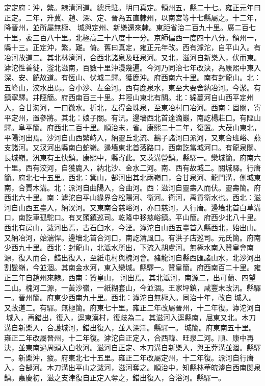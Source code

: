 \begin{pinyinscope}
定定府：沖，繁。隸清河道。總兵駐。明曰真定。領州五，縣二十七。雍正元年曰正定。二年，升冀、趙、深、定、晉為五直隸州，以南宮等十七縣屬之。十二年，降晉州，並所屬無極、城與定州、新樂還來隸。東距省治二百九十里。廣二百七十里，袤三百八十里。北極高三十八度十一分。京師偏西一度四十八分。領州一，縣十三。正定沖，繁，難。倚。舊曰真定，雍正元年改。西有滹沱，自平山入。有冶河故道二。其北林濟河，合西北諸泉及旺泉河。又北，滋河自新樂入，伏而東。滹沱性善徙，滏北滋南，百數十里沖漫幾遍。今河乃同治七年改決，為康熙中東入深、安、饒故道。有恆山、伏城二驛。獲鹿沖。府西南六十里。南有封龍山。北：五峰山，洨水出焉。合小沙、左金河。西有鹿泉水，東至大要舍納冶河。今淤。有鎮寧驛。井陘簡。府西南百三十里。井陘山東北有關。北：綿蔓河自山西平定州入，合甘淘河，一曰微水。折北，左得金珠泉，至東冶村曰冶河。西南：固關，寄平定州，置參將。其北：娘子關。有汛。邊墻西北首達滴巖，南訖楊莊口。有陘山驛。阜平簡。府西北二百十里。順治末，省。康熙二十二年，復置。大茂山東北，平陽河出焉。沙河自山西繁峙入，納靈丘北流、鷂子諸河曰派河，又東合班峪、燕支諸河。又汊河出縣南白蛇嶺。邊墻東北首落路口，西南訖當城河口。有龍泉關、長城嶺。汛東有王快鎮。康熙中，縣寄此。又茨溝營鎮。縣驛一。欒城簡。府南六十里。西有洨河，自獲鹿入，納北沙、金水二河。南、西有故城二。關城驛。行唐簡。府北七十五里。西北：箕山，郜河出其北兩嶺口，合甘泉河、龍門溝，側城東南，合賈木溝。北：派河自曲陽入，合曲河。西：滋河自靈壽入而伏。靈壽簡。府西北六十里。南：滹沱自平山緣界合松陽河、衛河。衛河，禹貢衛水也。西北：滋河自山西五臺入，納汊河。又東南合慈峪河，亦曰慈河，入行唐。邊墻北首白草溝口，南訖車孤駝口。有叉頭鎮巡司。乾隆中移慈峪鎮。平山簡。府西少北八十里。西北有房山，濊河出焉，古石臼水，今湮。滹沱自山西五臺首入縣西北，始出山。又納冶河，始湍悍。邊墻北首合河口，南訖清風口。有洪子店巡司。元氏簡。府南少西九十里。西北：封龍山，北泜水所出，下流入胡盧河。無極水南入贊皇會南源，復入而合，錯出復入，至紙屯村與槐河會。豬龍河自縣西匯諸山水，北沙河出割髭嶺，今並涸。其南金水河，東入欒城。縣驛一。贊皇簡。府西南百二十里。雍正三年自趙州來隸。西南：贊皇山，河出焉。其北泜河，南源二，出可蘭、四望二山。槐河二源，一黃沙嶺，一紙糊套山，今並涸。王家坪鎮，咸豐末改汛。縣驛一。晉州簡。府東少西南九十里。西北：滹沱自無極入。同治十年，改自城入。又故道二。有驛。無極簡。府東七十里。雍正二年改屬晉州，十二年復。滹沱河自城入，再錯出，復入，逕東漢村，復歧為二。其滋河入逕縣南，屈東又北。木刀溝自新樂入，合護城河，錯出復入，並入深澤。縣驛一。城簡。府東南五十里。雍正二年改屬晉州，十二年復。滹沱自正定入，合西韓、旺泉二河。順、康中再決，並東南過周頭入白牧河。滋河自正定、木刀溝自新樂入，與王莽溝並涸。縣驛一。新樂沖，疲。府東北七十五里。雍正二年改屬定州，十二年復。派河自行唐入，合郜河。木刀溝出平山之濊河，滋河奪之。順治中，知縣林華皖濬自西南閔泉鎮。嘉慶初，滋之支津復自正定入奪之，錯出復入，合浴河。縣驛一。


\end{pinyinscope}
